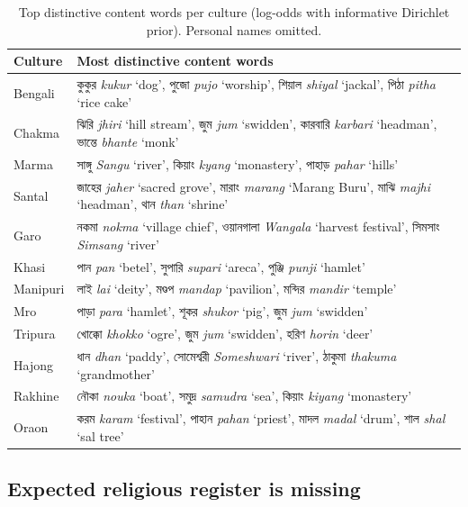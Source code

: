 \documentclass[11pt]{article}
\newcommand{\bn}[1]{{\bnfont #1}}
\newcommand{\bng}[3]{\bn{#1} \textit{#2} `#3'}
\begin{document}
\begin{table}[t]
\centering\small
\setlength{\tabcolsep}{3pt}
\begin{tabular}{@{}lp{5.4cm}@{}}
\toprule
Culture & Most distinctive content words \\
\midrule
Bengali  & \bng{কুকুর}{kukur}{dog}, \bng{পুজো}{pujo}{worship}, \bng{শিয়াল}{shiyal}{jackal}, \bng{পিঠা}{pitha}{rice cake} \\
Chakma   & \bng{ঝিরি}{jhiri}{hill stream}, \bng{জুম}{jum}{swidden}, \bng{কারবারি}{karbari}{headman}, \bng{ভান্তে}{bhante}{monk} \\
Marma    & \bng{সাঙ্গু}{Sangu}{river}, \bng{কিয়াং}{kyang}{monastery}, \bng{পাহাড়}{pahar}{hills} \\
Santal   & \bng{জাহের}{jaher}{sacred grove}, \bng{মারাং}{marang}{Marang Buru}, \bng{মাঝি}{majhi}{headman}, \bng{থান}{than}{shrine} \\
Garo     & \bng{নকমা}{nokma}{village chief}, \bng{ওয়ানগালা}{Wangala}{harvest festival}, \bng{সিমসাং}{Simsang}{river} \\
Khasi    & \bng{পান}{pan}{betel}, \bng{সুপারি}{supari}{areca}, \bng{পুঞ্জি}{punji}{hamlet} \\
Manipuri & \bng{লাই}{lai}{deity}, \bng{মণ্ডপ}{mandap}{pavilion}, \bng{মন্দির}{mandir}{temple} \\
Mro      & \bng{পাড়া}{para}{hamlet}, \bng{শূকর}{shukor}{pig}, \bng{জুম}{jum}{swidden} \\
Tripura  & \bng{খোক্কো}{khokko}{ogre}, \bng{জুম}{jum}{swidden}, \bng{হরিণ}{horin}{deer} \\
Hajong   & \bng{ধান}{dhan}{paddy}, \bng{সোমেশ্বরী}{Someshwari}{river}, \bng{ঠাকুমা}{thakuma}{grandmother} \\
Rakhine  & \bng{নৌকা}{nouka}{boat}, \bng{সমুদ্র}{samudra}{sea}, \bng{কিয়াং}{kiyang}{monastery} \\
Oraon    & \bng{করম}{karam}{festival}, \bng{পাহান}{pahan}{priest}, \bng{মাদল}{madal}{drum}, \bng{শাল}{shal}{sal tree} \\
\bottomrule
\end{tabular}
\caption{Top distinctive content words per culture (log-odds with informative
Dirichlet prior). Personal names omitted.}
\label{tab:distinctive}
\end{table}

\subsection{Expected religious register is missing}
\label{sec:register}
\end{document}
